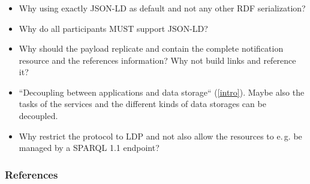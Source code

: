 \documentclass[aspectratio=169,hideallsubsections]{beamer}
\begin{document}
\begin{frame}
  \frametitle{\insertsection}%

  
  \begin{itemize}
   \item Why using exactly JSON-LD as default and not any other RDF serialization?
   \item Why do all participants MUST support JSON-LD?
   \item Why should the payload replicate and contain the complete notification resource and the references information? Why not build links and reference it?
   \item “Decoupling between applications and data storage“ (\ref{intro}). Maybe also the tasks of the services and the different kinds of data storages can be decoupled.
   \item Why restrict the protocol to LDP and not also allow the resources to e.\,g. be managed by a SPARQL 1.1 endpoint?
  \end{itemize}

\end{frame}

\begin{frame}[allowframebreaks]
  \frametitle{References}
  
  
\end{frame}

% 
\end{document}
